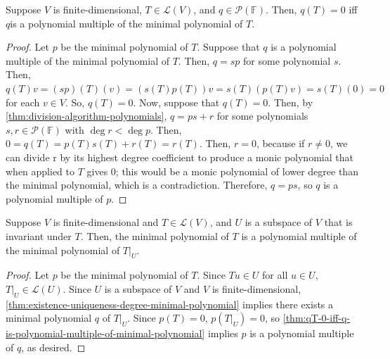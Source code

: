 \documentclass{article}
\begin{document}
\begin{theorem}[$q(T) = 0$ iff $q$ is a polynomial multiple of the
  minimal polynomial]
  \label{thm:qT-0-iff-q-is-polynomial-multiple-of-minimal-polynomial}
  Suppose $V$ is finite-dimensional, $T \in \mathcal{L}(V)$, and $q
  \in \mathcal{P}(\mathbb{F})$. Then, $q(T) = 0$ iff $q$is a
  polynomial multiple of the minimal polynomial of $T$.
\end{theorem}
\begin{proof}
  Let $p$ be the minimal polynomial of $T$. Suppose that $q$ is a
  polynomial multiple of the minimal polynomial of $T$. Then, $q = sp$
  for some polynomial $s$. Then, $q(T)v = (sp)(T)(v) = (s(T)p(T))v =
  s(T)(p(T)v) = s(T)(0) = 0$ for each $v \in V$. So, $q(T) = 0$. Now,
  suppose that $q(T) = 0$. Then, by
  \cref{thm:division-algorithm-polynomials}, $q = ps + r$ for some
  polynomials $s, r \in \mathcal{P}(\mathbb{F})$ with $\deg r < \deg
  p$. Then, $0 = q(T) = p(T)s(T) + r(T) = r(T)$. Then, $r = 0$,
  because if $r \ne 0$, we can divide r by its highest degree
  coefficient to produce a monic polynomial that when applied to $T$
  gives $0$; this would be a monic polynomial of lower degree than the
  minimal polynomial, which is a contradiction. Therefore, $q = ps$,
  so $q$ is a polynomial multiple of $p$.
\end{proof}

\begin{theorem}
  \label{thm:minimal-polynomial-of-restriction-operator}
  Suppose $V$ is finite-dimensional and $T \in \mathcal{L}(V)$, and
  $U$ is a subspace of $V$ that is invariant under $T$. Then, the
  minimal polynomial of $T$ is a polynomial multiple of the minimal
  polynomial of $T|_U$.
\end{theorem}
\begin{proof}
  Let $p$ be the minimal polynomial of $T$. Since $Tu \in U$ for all
  $u \in U$, $T|_U \in \mathcal{L}(U)$. Since $U$ is a subspace of $V$
  and $V$ is finite-dimensional,
  \cref{thm:existence-uniqueness-degree-minimal-polynomial} implies
  there exists a minimal polynomial $q$ of $T|_U$. Since $p(T) = 0$,
  $p(T|_U) = 0$, so
  \cref{thm:qT-0-iff-q-is-polynomial-multiple-of-minimal-polynomial}
  implies $p$ is a polynomial multiple of $q$, as desired.
\end{proof}
\end{document}
